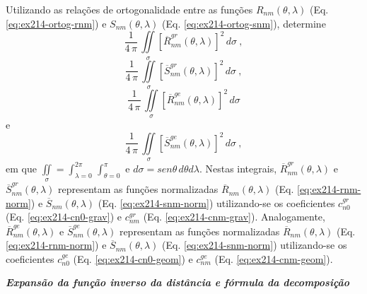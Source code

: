\documentclass[10pt,a4paper,fleqn]{article}
\begin{document}
Utilizando as relaç\~{o}es de ortogonalidade entre as funç\~{o}es $R_{nm}(\theta, \lambda)$ 
(Eq. \ref{eq:ex214-ortog-rnm}) e $S_{nm}(\theta, \lambda)$ (Eq. \ref{eq:ex214-ortog-snm}),
determine 
$$\dfrac{1}{4 \, \pi} \, \iint \limits_{\sigma} \left[ \overline{R}_{nm}^{gr} (\theta, \lambda)
\right]^{2} \, d \sigma \: ,$$ 
$$\dfrac{1}{4 \, \pi} \, \iint \limits_{\sigma} \left[ \overline{S}_{nm}^{gr} (\theta, \lambda)
\right]^{2} \, d \sigma \: ,$$ 
$$\dfrac{1}{4 \, \pi} \, \iint \limits_{\sigma} \left[ \overline{R}_{nm}^{ge} (\theta, \lambda)
\right]^{2} \, d \sigma$$ 
e
$$\dfrac{1}{4 \, \pi} \, \iint \limits_{\sigma} \left[ \overline{S}_{nm}^{ge}  (\theta, \lambda)
\right]^{2} \, d \sigma \: ,$$
em que $\iint \limits_{\sigma} = \int_{\lambda = 0}^{2\pi} \, \int_{\theta = 0}^{\pi}$ e $d \sigma 
= sen\theta \, d\theta d\lambda$. Nestas integrais, $\overline{R}_{nm}^{gr} (\theta, \lambda)$ e 
$\overline{S}_{nm}^{gr} (\theta, \lambda)$ representam as funç\~{o}es normalizadas $\overline{R}_{nm}
(\theta, \lambda)$ (Eq. \ref{eq:ex214-rnm-norm}) e $\overline{S}_{nm} (\theta, \lambda)$ 
(Eq. \ref{eq:ex214-snm-norm}) utilizando-se os coeficientes $c_{n0}^{gr}$ (Eq. \ref{eq:ex214-cn0-grav}) 
e $c_{nm}^{gr}$ (Eq. \ref{eq:ex214-cnm-grav}). Analogamente, $\overline{R}_{nm}^{ge} (\theta, \lambda)$ 
e $\overline{S}_{nm}^{ge} (\theta, \lambda)$ representam as funç\~{o}es normalizadas 
$\overline{R}_{nm} (\theta, \lambda)$ (Eq. \ref{eq:ex214-rnm-norm}) e $\overline{S}_{nm} (\theta, \lambda)$ 
(Eq. \ref{eq:ex214-snm-norm}) utilizando-se os coeficientes $c_{n0}^{ge}$ 
(Eq. \ref{eq:ex214-cn0-geom}) e $c_{nm}^{ge}$ (Eq. \ref{eq:ex214-cnm-geom}).

\begin{flushleft}
\dotfill
\end{flushleft}

\bigskip
\bigskip

\begin{flushleft}
\emph{\textbf{Expans\~{a}o da funç\~{a}o inverso da dist\^{a}ncia e f\'{o}rmula da decomposiç\~{a}o}}
\end{flushleft}

\bigskip
\bigskip
\end{document}
